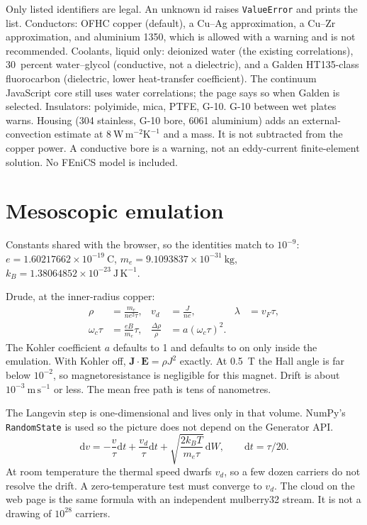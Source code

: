 \documentclass[11pt]{article}
\begin{document}
Only listed identifiers are legal.
An unknown id raises \texttt{ValueError} and prints the list.
Conductors: OFHC copper (default), a Cu--Ag approximation, a Cu--Zr approximation, and aluminium 1350, which is allowed with a warning and is not recommended.
Coolants, liquid only: deionized water (the existing correlations), 30~percent water--glycol (conductive, not a dielectric), and a Galden HT135-class fluorocarbon (dielectric, lower heat-transfer coefficient).
The continuum JavaScript core still uses water correlations; the page says so when Galden is selected.
Insulators: polyimide, mica, PTFE, G-10.
G-10 between wet plates warns.
Housing (304 stainless, G-10 bore, 6061 aluminium) adds an external-convection estimate at $8~\mathrm{W\,m^{-2}K^{-1}}$ and a mass.
It is not subtracted from the copper power.
A conductive bore is a warning, not an eddy-current finite-element solution.
No FEniCS model is included.

\section{Mesoscopic emulation}

Constants shared with the browser, so the identities match to $10^{-9}$:
$e=1.60217662\times 10^{-19}~\mathrm{C}$,
$m_e=9.1093837\times 10^{-31}~\mathrm{kg}$,
$k_B=1.38064852\times 10^{-23}~\mathrm{J\,K^{-1}}$.

Drude, at the inner-radius copper:
\begin{align}
\rho &= \frac{m_e}{n e^2 \tau},&
v_d &= \frac{J}{n e},&
\lambda &= v_F \tau,\\
\omega_c\tau &= \frac{eB}{m_e}\tau,&
\frac{\Delta\rho}{\rho} &= a(\omega_c\tau)^2.
\end{align}
The Kohler coefficient $a$ defaults to 1 and defaults to on only inside the emulation.
With Kohler off, $\mathbf{J}\cdot\mathbf{E}=\rho J^2$ exactly.
At 0.5~T the Hall angle is far below $10^{-2}$, so magnetoresistance is negligible for this magnet.
Drift is about $10^{-3}~\mathrm{m\,s^{-1}}$ or less.
The mean free path is tens of nanometres.

The Langevin step is one-dimensional and lives only in that volume.
NumPy's \texttt{RandomState} is used so the picture does not depend on the Generator API.
\begin{equation}
\mathrm{d}v = -\frac{v}{\tau}\mathrm{d}t + \frac{v_d}{\tau}\mathrm{d}t
+ \sqrt{\frac{2k_B T}{m_e\tau}}\,\mathrm{d}W,
\qquad \mathrm{d}t=\tau/20.
\end{equation}
At room temperature the thermal speed dwarfs $v_d$, so a few dozen carriers do not resolve the drift.
A zero-temperature test must converge to $v_d$.
The cloud on the web page is the same formula with an independent mulberry32 stream.
It is not a drawing of $10^{28}$ carriers.
\end{document}
